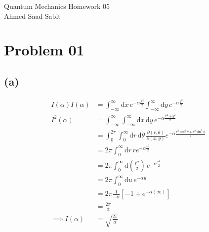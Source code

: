 \documentclass[letterpaper]{article}
\begin{document}
\pagestyle{fancy}
\fancyhead{} %
\fancyhead[C]{\rightmark}
\fancyfoot{}
\renewcommand{\footrulewidth}{0.4pt}

\newlength\adder
\setlength\adder{1cm}
\addtolength\headwidth{2\adder}
\fancyheadoffset{\adder}

\fancyfoot[C]{\vspace{0.3cm}\\ \thepage}

\begin{center}
\Large{ \textsf{
Quantum Mechanics Homework 05\\ 
Ahmed Saad Sabit
}	}
\end{center}

\section*{Problem 01} 
\subsection*{(a)} 
\begin{align*}
	I(\alpha) I (\alpha) &= 
\int_{-\infty}^{\infty} \mathrm{d} x \, e^{ - \alpha \frac{x^2}{2}}  
\int_{-\infty}^{\infty} \mathrm{d} y \, e^{ - \alpha \frac{y^2}{2}}  
	\\ 
	I^2(\alpha) &= 
	\int_{-\infty}^{\infty} 
	\int_{-\infty}^{\infty} 
	\mathrm{d} x \, \mathrm{d} y \, 
	e^{ - \alpha \frac{x^2 + y^2}{2}}\\
	&= 
	\int_{0}^{2 \pi } \int_{0}^{\infty}   
\mathrm{d} r \, \mathrm{d} \theta \, 
\frac{\partial (r, \theta)}{\partial (x , y)} e^{ - \alpha \frac{r^2 \cos ^2 \theta + r^2 \sin ^2 \theta}{2}}
	\\
	&= 2\pi \int_{0}^{\infty} \mathrm{d} r \, r e^{- \alpha \frac{r^2}{2}}  \\
	&= 2\pi \int_{0}^{\infty} \mathrm{d} \left(\frac{r^2}{2}\right) \,  e^{- \alpha \frac{r^2}{2}}  \\ 
	&= 2\pi \int_{0}^{\infty} \mathrm{d} u \, e^{ - \alpha u}  \\
	&= 2 \pi \frac{1}{- \alpha} [-1 + e^{ - \alpha (\infty)} ]   \\
	&= \frac{2\pi}{\alpha} \\ 
\implies I(\alpha) &= \sqrt{ \frac{2\pi}{\alpha}}
\end{align*}
\end{document}

